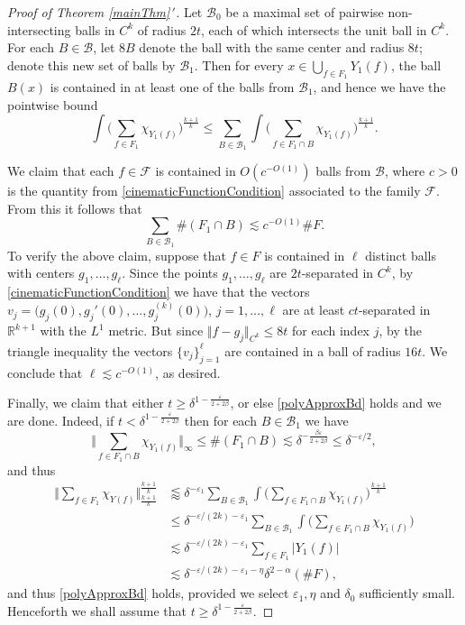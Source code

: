 \documentclass[letterpaper, reqno,11pt]{article}
\numberwithin{equation}{section}
\newcommand{\RR}{\mathbb{R}}
\newcommand{\eps}{\varepsilon}
\numberwithin{thm}{section}
\theoremstyle{remark}
\begin{document}
\begin{proof}[Proof of Theorem \ref{mainThm}\,$'$]
Let $\mathcal{B}_0$ be a maximal set of pairwise non-intersecting balls in $C^k$ of radius $2t$, each of which intersects the unit ball in $C^k$. For each $B\in\mathcal{B}$, let $8B$ denote the ball with the same center and radius $8t$; denote this new set of balls by $\mathcal{B}_1$. Then for every $x\in \bigcup_{f\in F_1} Y_1(f)$, the ball $B(x)$ is contained in at least one of the balls from $\mathcal{B}_1$, and hence we have the pointwise bound
\begin{equation}\label{sumOverF1VsSumOverBalls}
\int \Big(\sum_{f\in F_1} \chi_{Y_1(f)} \Big)^{\frac{k+1}{k}}\leq \sum_{B\in\mathcal{B}_1} \int \Big(\sum_{f\in F_1\cap B} \chi_{Y_1(f)} \Big)^{\frac{k+1}{k}}.
\end{equation}

We claim that each $f\in\mathcal{F}$ is contained in $O(c^{-O(1)})$ balls from $\mathcal{B}$, where $c>0$ is the quantity from \eqref{cinematicFunctionCondition} associated to the family $\mathcal{F}$. From this it follows that
\[
\sum_{B\in\mathcal{B}_1}\#(F_1\cap B)\lesssim c^{-O(1)}\#F.
\]
To verify the above claim, suppose that $f\in F$ is contained in $\ell$ distinct balls with centers $g_1,\ldots,g_\ell$. Since the points $g_1,\ldots,g_\ell$ are $2t$-separated in $C^k$, by \eqref{cinematicFunctionCondition} we have that the vectors $v_j = \big(g_j(0), g_j'(0),\ldots, g_j^{(k)}(0)\big)$, $j=1,\ldots,\ell$ are at least $c t$-separated in $\RR^{k+1}$ with the $L^1$ metric. But since $\Vert f - g_j\Vert_{C^k}\leq 8t$ for each index $j$, by the triangle inequality the vectors $\{v_j\}_{j=1}^\ell$ are contained in a ball of radius $16t$. We conclude that $\ell\lesssim c^{-O(1)}$, as desired. 

Finally, we claim that either $t\geq\delta^{1-\frac{\eps}{2+2\beta}}$, or else \eqref{polyApproxBd} holds and we are done. Indeed, if $t<\delta^{1-\frac{\eps}{2+2\beta}}$ then for each $B\in\mathcal{B}_1$ we have
\[
\Big\Vert \sum_{f\in F_1\cap B} \chi_{Y_1(f)}\Big\Vert_\infty \leq \#(F_1\cap B)\lesssim \delta^{-\frac{\beta\eps}{2+2\beta}} \leq\delta^{-\eps/2},
\]
and thus
\begin{equation*}
\begin{split}
\Big\Vert \sum_{f\in F_1} \chi_{Y(f)} \Big\Vert_{\frac{k+1}{k}}^{\frac{k+1}{k}}
&\lessapprox \delta^{-\eps_1} \sum_{B\in\mathcal{B}_1} \int \Big(\sum_{f\in F_1\cap B} \chi_{Y_1(f)} \Big)^{\frac{k+1}{k}}\\
&\leq \delta^{-\eps/(2k)-\eps_1}\sum_{B\in\mathcal{B}_1}\int \Big(\sum_{f\in F_1\cap B} \chi_{Y_1(f)} \Big)\\
& \lesssim  \delta^{-\eps/(2k)-\eps_1}\sum_{f\in F_1}|Y_1(f)|\\
& \lesssim \delta^{-\eps/(2k)-\eps_1-\eta}\delta^{2-\alpha}(\#F),
\end{split}
\end{equation*}
and thus \eqref{polyApproxBd} holds, provided we select $\eps_1,\eta$ and $\delta_0$ sufficiently small. Henceforth we shall assume that $t\geq\delta^{1-\frac{\eps}{2+2\beta}}$. 


\end{proof}
\end{document}
